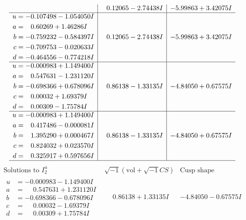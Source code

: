 \documentclass[1p]{elsarticle_modified}
\theoremstyle{definition}
\newcommand{\I}{\sqrt{-1}}
\begin{document}
$$\begin{array}{c|c|c}
 & \phantom{-}0.12065 - 2.74438 I & -5.99863 + 3.42075 I \\ \hline\begin{aligned}
u &= -0.107498 - 1.054050 I \\
a &= \phantom{-}0.60269 + 1.46286 I \\
b &= -0.759232 - 0.584397 I \\
c &= -0.709753 - 0.020633 I \\
d &= -0.464556 - 0.774218 I\end{aligned}
 & \phantom{-}0.12065 - 2.74438 I & -5.99863 + 3.42075 I \\ \hline\begin{aligned}
u &= -0.000983 + 1.149400 I \\
a &= \phantom{-}0.547631 - 1.231120 I \\
b &= -0.698366 + 0.678096 I \\
c &= \phantom{-}0.00032 + 1.69379 I \\
d &= \phantom{-}0.00309 - 1.75784 I\end{aligned}
 & \phantom{-}0.86138 - 1.33135 I & -4.84050 + 0.67575 I \\ \hline\begin{aligned}
u &= -0.000983 + 1.149400 I \\
a &= \phantom{-}0.417486 - 0.000081 I \\
b &= \phantom{-}1.395290 + 0.000467 I \\
c &= \phantom{-}0.824032 + 0.023570 I \\
d &= \phantom{-}0.325917 + 0.597656 I\end{aligned}
 & \phantom{-}0.86138 - 1.33135 I & -4.84050 + 0.67575 I\\
 \hline 
 \end{array}$$\newpage$$\begin{array}{c|c|c}  
\text{Solutions to }I^u_{2}& \I (\text{vol} + \sqrt{-1}CS) & \text{Cusp shape}\\
 \hline 
\begin{aligned}
u &= -0.000983 - 1.149400 I \\
a &= \phantom{-}0.547631 + 1.231120 I \\
b &= -0.698366 - 0.678096 I \\
c &= \phantom{-}0.00032 - 1.69379 I \\
d &= \phantom{-}0.00309 + 1.75784 I\end{aligned}
 & \phantom{-}0.86138 + 1.33135 I & -4.84050 - 0.67575 I \\ \hline\begin{aligned}

\end{aligned}
\end{array}$$
\end{document}
